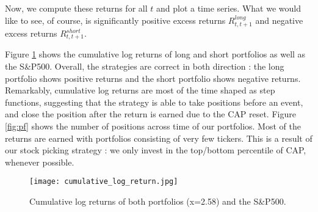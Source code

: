 Now, we compute these returns for all $t$ and plot a time series.  What we would like to see, of course, is significantly positive excess returns $R^{long}_{t,t+1}$ and negative excess returns $R^{short}_{t,t+1}$. 

Figure \ref{fig:cumretpf} shows the cumulative log returns of long and short portfolios as well as the S\&P500. Overall, the strategies are correct in both direction : the long portfolio shows positive returns and the short portfolio shows negative returns. Remarkably, cumulative log returns are most of the time shaped as step functions, suggesting that the strategy is able to take positions before an event, and close the position after the return is earned due to the CAP reset. Figure \ref{fig:pf} shows the number of positions across time of our portfolios. Most of the returns are earned with portfolios consisting of very few tickers. This is a result of our stock picking strategy : we only invest in the top/bottom percentile of CAP, whenever possible.

\begin{figure}
    \centering
    \texttt{[image: cumulative\_log\_return.jpg]}
    \caption{Cumulative log returns of both portfolios (x=2.58) and the S\&P500.}
    \label{fig:cumretpf}
\end{figure}

